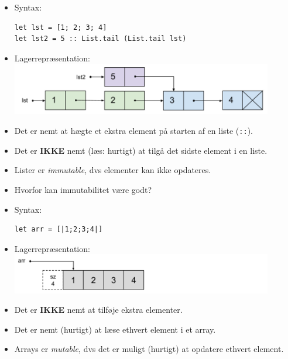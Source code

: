\documentclass[rgb]{beamer}
\begin{document}
\begin{frame}[fragile]
\begin{footnotesize}


  \begin{itemize}
  \item Syntax:
\begin{lstlisting}[numbers=none,frame=none]
let lst = [1; 2; 3; 4]
let lst2 = 5 :: List.tail (List.tail lst)
\end{lstlisting}

  \item Lagerrepræsentation:
    \includegraphics[width=0.9\textwidth]{list1234.png}

  \item Det er nemt at hægte et ekstra element på starten af en liste (\texttt{::}).

  \item Det er \textbf{IKKE} nemt (læs: hurtigt) at tilgå det sidste element i en liste.

  \item Lister er \emph{immutable}, dvs elementer kan ikke opdateres.

  \item Hvorfor kan immutabilitet være godt?
  \end{itemize}
\end{footnotesize}
\end{frame}

\begin{frame}[fragile]
\begin{footnotesize}

  \begin{itemize}
  \item Syntax:
\begin{lstlisting}[numbers=none,frame=none]
let arr = [|1;2;3;4|]
\end{lstlisting}

  \item Lagerrepræsentation: \\
    \includegraphics[width=0.9\textwidth]{array1234.png}
  \item Det er \textbf{IKKE} nemt at tilføje ekstra elementer.
  \item Det er nemt (hurtigt) at læse ethvert element i et array.

  \item Arrays er \emph{mutable}, dvs det er muligt (hurtigt) at
    opdatere ethvert element.
  \end{itemize}
\end{footnotesize}
\end{frame}
\end{document}
